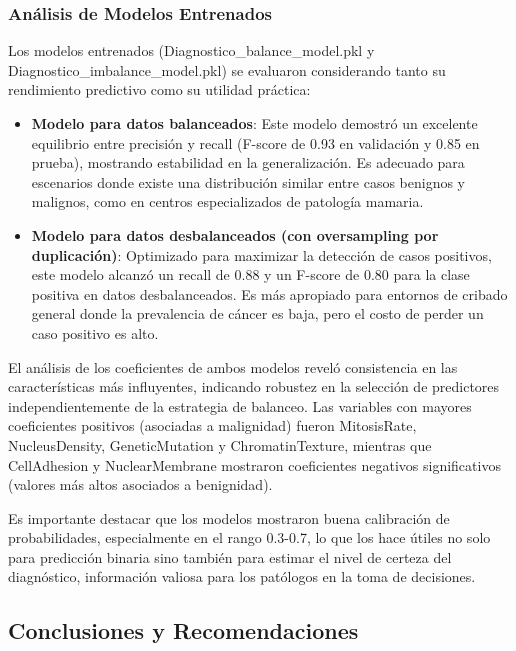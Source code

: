 \subsubsection{Análisis de Modelos Entrenados}

Los modelos entrenados (Diagnostico\_balance\_model.pkl y Diagnostico\_imbalance\_model.pkl) se evaluaron considerando tanto su rendimiento predictivo como su utilidad práctica:

\begin{itemize}
    \item \textbf{Modelo para datos balanceados}: Este modelo demostró un excelente equilibrio entre precisión y recall (F-score de 0.93 en validación y 0.85 en prueba), mostrando estabilidad en la generalización. Es adecuado para escenarios donde existe una distribución similar entre casos benignos y malignos, como en centros especializados de patología mamaria.
    
    \item \textbf{Modelo para datos desbalanceados (con oversampling por duplicación)}: Optimizado para maximizar la detección de casos positivos, este modelo alcanzó un recall de 0.88 y un F-score de 0.80 para la clase positiva en datos desbalanceados. Es más apropiado para entornos de cribado general donde la prevalencia de cáncer es baja, pero el costo de perder un caso positivo es alto.
\end{itemize}

El análisis de los coeficientes de ambos modelos reveló consistencia en las características más influyentes, indicando robustez en la selección de predictores independientemente de la estrategia de balanceo. Las variables con mayores coeficientes positivos (asociadas a malignidad) fueron MitosisRate, NucleusDensity, GeneticMutation y ChromatinTexture, mientras que CellAdhesion y NuclearMembrane mostraron coeficientes negativos significativos (valores más altos asociados a benignidad).

Es importante destacar que los modelos mostraron buena calibración de probabilidades, especialmente en el rango 0.3-0.7, lo que los hace útiles no solo para predicción binaria sino también para estimar el nivel de certeza del diagnóstico, información valiosa para los patólogos en la toma de decisiones.

\subsection{Conclusiones y Recomendaciones}

